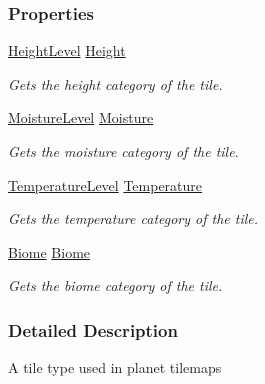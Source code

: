 \subsubsection*{Properties}
\begin{DoxyCompactItemize}
\item 
\hyperlink{namespace_midnight_blue_a86f8aaa0bbb651a6a094d3eb95f799e0}{Height\+Level} \hyperlink{class_midnight_blue_1_1_planet_tile_a64d018817a484ab3b4559773b0971974}{Height}
\begin{DoxyCompactList}\small\item\em Gets the height category of the tile. \end{DoxyCompactList}\item 
\hyperlink{namespace_midnight_blue_a7428767e7fc0b52bab6cb270f8354e1d}{Moisture\+Level} \hyperlink{class_midnight_blue_1_1_planet_tile_a867d91b1185e400c608eea5e20ba4614}{Moisture}
\begin{DoxyCompactList}\small\item\em Gets the moisture category of the tile. \end{DoxyCompactList}\item 
\hyperlink{namespace_midnight_blue_a6ea6484178cbe707f25d1a0ed56db7ab}{Temperature\+Level} \hyperlink{class_midnight_blue_1_1_planet_tile_a7e2a7e01274b4ea505871b115b8534ae}{Temperature}
\begin{DoxyCompactList}\small\item\em Gets the temperature category of the tile. \end{DoxyCompactList}\item 
\hyperlink{namespace_midnight_blue_a8a6ba5637b64c3eb991f00d48decf381}{Biome} \hyperlink{class_midnight_blue_1_1_planet_tile_a56f9f50efa0b740b3ce229cb4170fd97}{Biome}
\begin{DoxyCompactList}\small\item\em Gets the biome category of the tile. \end{DoxyCompactList}\end{DoxyCompactItemize}


\subsubsection{Detailed Description}
A tile type used in planet tilemaps 



